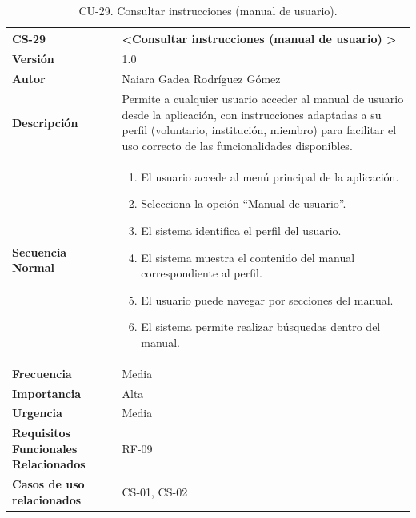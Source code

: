 \begin{table}[htbp] %
\centering
\begin{tabular}{ |m{3cm}|m{11cm}|  } 
\hline
\cellcolor[HTML]{B9E3F0}\centering\textbf{CS-29} & \cellcolor[HTML]{B9E3F0}\textbf{\textless Consultar instrucciones (manual de usuario) \textgreater}\\

\hline
\cellcolor[HTML]{EFEFEF}\textbf{Versión}             & 1.0  \\
\hline
\cellcolor[HTML]{EFEFEF}\textbf{Autor}                & Naiara Gadea Rodríguez Gómez\\
\hline
\cellcolor[HTML]{EFEFEF}\textbf{Descripción}                & {Permite a cualquier usuario acceder al manual de usuario desde la aplicación, con instrucciones adaptadas a su perfil (voluntario, institución, miembro) para facilitar el uso correcto de las funcionalidades disponibles.}\\
\hline
\cellcolor[HTML]{EFEFEF}\textbf{Secuencia \newline Normal}                &                 
        \begin{enumerate}
			\item El usuario accede al menú principal de la aplicación.
			\item Selecciona la opción “Manual de usuario”.
			\item El sistema identifica el perfil del usuario.
			\item El sistema muestra el contenido del manual correspondiente al perfil.
			\item El usuario puede navegar por secciones del manual.
			\item El sistema permite realizar búsquedas dentro del manual.
		\end{enumerate}\\
\hline
\cellcolor[HTML]{EFEFEF}\textbf{Frecuencia}                & Media\\
\hline
\cellcolor[HTML]{EFEFEF}\textbf{Importancia}                & Alta\\
\hline
\cellcolor[HTML]{EFEFEF}\textbf{Urgencia}                & Media\\
\hline
\cellcolor[HTML]{EFEFEF}\textbf{Requisitos Funcionales Relacionados}                & {RF-09}\\
\hline
\cellcolor[HTML]{EFEFEF}\textbf{Casos de uso relacionados}                & {CS-01, CS-02}\\
\hline
\end{tabular}
\caption{CU-29. Consultar instrucciones (manual de usuario).}
\end{table}

